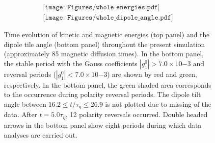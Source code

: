 \begin{figure}[ht]
\begin{center}
\[
\begin{array}{c}
\texttt{[image: Figures/whole\_energies.pdf]} \\
\texttt{[image: Figures/whole\_dipole\_angle.pdf]}
\end{array}
\]
\end{center}
\caption{
Time evolution of kinetic and magnetic energies (top panel) and the dipole tile angle (bottom panel) throughout the present simulation (approximately 85 magnetic diffusion times). In the bottom panel, the stable period with the Gauss coefficients $|g_{1}^{0}| > 7.0 \times 10{-3}$ and reversal periods ($|g_{1}^{0}| < 7.0 \times 10{-3}$) are shown by red and green, respectively. 
In the bottom panel, the green shaded area corresponds to the occurrence during polarity reversal periods.
The dipole tilt angle between $16.2 \le t / \tau_{\eta} \le 26.9$ is not plotted due to missing of the data. 
After $t = 5.0 \tau_{\eta}$, 12 polarity reversals occurred.
Double headed arrows in the bottom panel show eight periods during which data analyses are carried out.
}
\label{fig:sph_shell_275_full}
\end{figure}